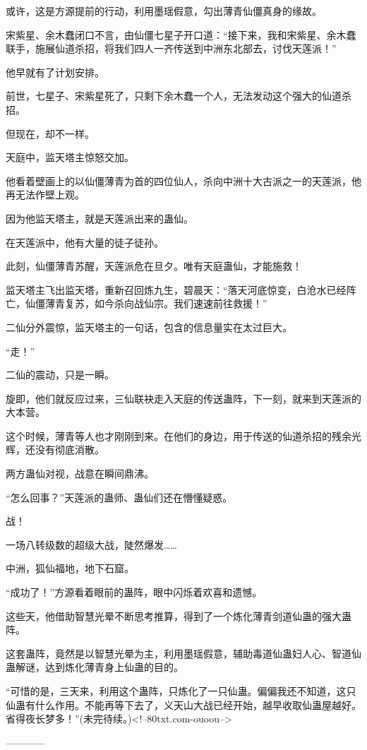\begin{this_body}
或许，这是方源提前的行动，利用墨瑶假意，勾出薄青仙僵真身的缘故。

宋紫星、余木蠢闭口不言，由仙僵七星子开口道：“接下来，我和宋紫星、余木蠢联手，施展仙道杀招，将我们四人一齐传送到中洲东北部去，讨伐天莲派！”

他早就有了计划安排。

前世，七星子、宋紫星死了，只剩下余木蠢一个人，无法发动这个强大的仙道杀招。

但现在，却不一样。

天庭中，监天塔主惊怒交加。

他看着壁画上的以仙僵薄青为首的四位仙人，杀向中洲十大古派之一的天莲派，他再无法作壁上观。

因为他监天塔主，就是天莲派出来的蛊仙。

在天莲派中，他有大量的徒子徒孙。

此刻，仙僵薄青苏醒，天莲派危在旦夕。唯有天庭蛊仙，才能施救！

监天塔主飞出监天塔，重新召回炼九生，碧晨天：“落天河底惊变，白沧水已经阵亡，仙僵薄青复苏，如今杀向战仙宗。我们速速前往救援！”

二仙分外震惊，监天塔主的一句话，包含的信息量实在太过巨大。

“走！”

二仙的震动，只是一瞬。

旋即，他们就反应过来，三仙联袂走入天庭的传送蛊阵，下一刻，就来到天莲派的大本营。

这个时候，薄青等人也才刚刚到来。在他们的身边，用于传送的仙道杀招的残余光辉，还没有彻底消散。

两方蛊仙对视，战意在瞬间鼎沸。

“怎么回事？”天莲派的蛊师、蛊仙们还在懵懂疑惑。

战！

一场八转级数的超级大战，陡然爆发……

中洲，狐仙福地，地下石窟。

“成功了！”方源看着眼前的蛊阵，眼中闪烁着欢喜和遗憾。

这些天，他借助智慧光晕不断思考推算，得到了一个炼化薄青剑道仙蛊的强大蛊阵。

这套蛊阵，竟然是以智慧光晕为主，利用墨瑶假意，辅助毒道仙蛊妇人心、智道仙蛊解谜，达到炼化薄青身上仙蛊的目的。

“可惜的是，三天来，利用这个蛊阵，只炼化了一只仙蛊。偏偏我还不知道，这只仙蛊有什么作用。不能再等下去了，义天山大战已经开始，越早收取仙蛊屋越好。省得夜长梦多！”(未完待续。)<!--80txt.com-ouoou-->

------------

\end{this_body}

